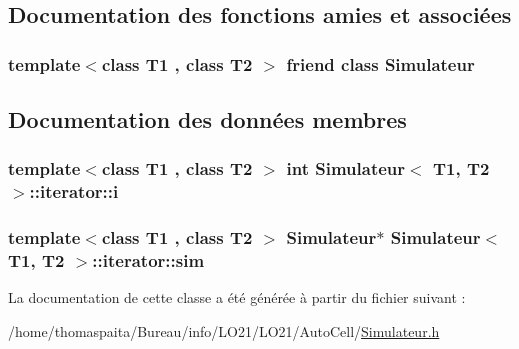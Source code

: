 \subsection{Documentation des fonctions amies et associées}
\subsubsection[{\texorpdfstring{Simulateur}{Simulateur}}]{\setlength{\rightskip}{0pt plus 5cm}template$<$class T1 , class T2 $>$ friend class {\bf Simulateur}\hspace{0.3cm}{\ttfamily [friend]}}\hypertarget{class_simulateur_1_1iterator_ae6c3966e699bf920c86e0bd006bd8183}{}\label{class_simulateur_1_1iterator_ae6c3966e699bf920c86e0bd006bd8183}


\subsection{Documentation des données membres}
\subsubsection[{\texorpdfstring{i}{i}}]{\setlength{\rightskip}{0pt plus 5cm}template$<$class T1 , class T2 $>$ int {\bf Simulateur}$<$ T1, T2 $>$\+::iterator\+::i\hspace{0.3cm}{\ttfamily [private]}}\hypertarget{class_simulateur_1_1iterator_ac4a7c0f2c42b4b85f598b36674b1d772}{}\label{class_simulateur_1_1iterator_ac4a7c0f2c42b4b85f598b36674b1d772}
\subsubsection[{\texorpdfstring{sim}{sim}}]{\setlength{\rightskip}{0pt plus 5cm}template$<$class T1 , class T2 $>$ {\bf Simulateur}$\ast$ {\bf Simulateur}$<$ T1, T2 $>$\+::iterator\+::sim\hspace{0.3cm}{\ttfamily [private]}}\hypertarget{class_simulateur_1_1iterator_aefe7dba8b546a3b2baabe60dfbed43f8}{}\label{class_simulateur_1_1iterator_aefe7dba8b546a3b2baabe60dfbed43f8}


La documentation de cette classe a été générée à partir du fichier suivant \+:\begin{DoxyCompactItemize}
\item 
/home/thomaspaita/\+Bureau/info/\+L\+O21/\+L\+O21/\+Auto\+Cell/\hyperlink{_simulateur_8h}{Simulateur.\+h}\end{DoxyCompactItemize}
